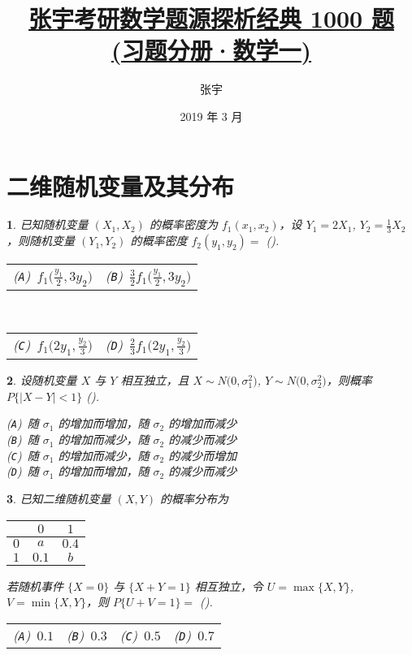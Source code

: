 \documentclass[openany,twocolumn]{ctexbook}
\title{\href{https://github.com/sikouhjw/zhangyu1000}{张宇考研数学题源探析经典 1000 题\\(习题分册·数学一)}}
\author{张宇}
\date{2019 年 3 月}
\makeatletter
\numberwithin{figure}{section}
\theoremstyle{change}
\theoremstyle{change}
\newtheorem{titwo}{}[chapter]
\def\kuo{ \mbox{(\hspace{1pc})}}
\newcommand{\fourch}[4]{\noindent\begin{tabular}{*{4}{@{}p{1.97cm}}}(\texttt{A})~#1 & (\texttt{B})~#2 & (\texttt{C})~#3 & (\texttt{D})~#4\end{tabular}} %
\newcommand{\twoch}[4]{\noindent\begin{tabular}{*{2}{@{}p{3.94cm}}}(\texttt{A})~#1 & (\texttt{B})~#2\end{tabular}\\\begin{tabular}{*{2}{@{}p{3.94cm}}}(\texttt{C})~#3 & (\texttt{D})~#4\end{tabular}}  %
\newcommand{\onech}[4]{\noindent(\texttt{A})~#1 \\ (\texttt{B})~#2 \\ (\texttt{C})~#3 \\ (\texttt{D})~#4}  %
\makeatother
\begin{document}
	
	\section{二维随机变量及其分布}
	\begin{titwo}
		已知随机变量 $(X_{1},X_{2})$ 的概率密度为 $f_{1}(x_{1},x_{2})$，设 $Y_{1} = 2X_{1}$, $Y_{2} = \frac{1}{3} X_{2}$，则随机变量 $(Y_{1},Y_{2})$ 的概率密度 $f_{2}(y_{1},y_{2}) = $ \kuo.

		\twoch{$f_{1} \bigl( \frac{y_{1}}{2}, 3y_{2} \bigr)$}{$\frac{3}{2} f_{1} \bigl( \frac{y_{1}}{2}, 3y_{2} \bigr)$}{$f_{1} \bigl( 2 y_{1}, \frac{y_{2}}{3} \bigr)$}{$\frac{2}{3} f_{1} \bigl( 2 y_{1}, \frac{y_{2}}{3} \bigr)$}
	\end{titwo}

	\begin{titwo}
		设随机变量 $X$ 与 $Y$ 相互独立，且 $X \sim N\bigl( 0,\sigma_{1}^{2} \bigr)$, $Y \sim N\bigl( 0,\sigma_{2}^{2} \bigr)$，则概率 $P \{ |X - Y| < 1 \}$ \kuo.

		\onech{随 $\sigma_{1}$ 的增加而增加，随 $\sigma_{2}$ 的增加而减少}{随 $\sigma_{1}$ 的增加而减少，随 $\sigma_{2}$ 的减少而减少}{随 $\sigma_{1}$ 的增加而减少，随 $\sigma_{2}$ 的减少而增加}{随 $\sigma_{1}$ 的增加而增加，随 $\sigma_{2}$ 的减少而减少}
	\end{titwo}

	\begin{titwo}
		已知二维随机变量 $(X,Y)$ 的概率分布为
		\begin{center}
			\begin{tabular}{c|cc}
				\hline
				\diagbox{$X$}{$Y$} & $0$ & $1$ \\
				\hline
				$0$ & $a$ & $0.4$ \\
				$1$ & $0.1$ & $b$ \\
				\hline
			\end{tabular}
		\end{center}
		若随机事件 $\{ X = 0 \}$ 与 $\{ X + Y = 1 \}$ 相互独立，令 $U = \max \{ X, Y \}$, $V = \min \{ X, Y \}$，则 $P \{ U + V = 1 \} = $ \kuo.

		\fourch{$0.1$}{$0.3$}{$0.5$}{$0.7$}
	\end{titwo}
\end{document}
